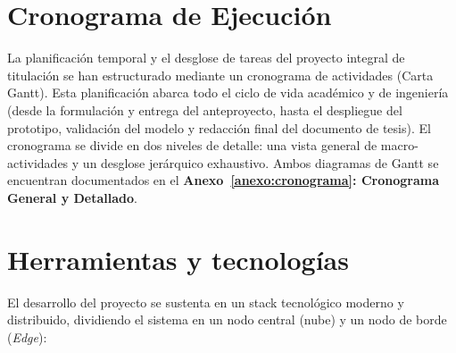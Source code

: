 \section{Cronograma de Ejecución}
La planificación temporal y el desglose de tareas del proyecto integral de titulación se han estructurado mediante un cronograma de actividades (Carta Gantt). Esta planificación abarca todo el ciclo de vida académico y de ingeniería (desde la formulación y entrega del anteproyecto, hasta el despliegue del prototipo, validación del modelo y redacción final del documento de tesis). El cronograma se divide en dos niveles de detalle: una vista general de macro-actividades y un desglose jerárquico exhaustivo. Ambos diagramas de Gantt se encuentran documentados en el \textbf{Anexo~\ref{anexo:cronograma}: Cronograma General y Detallado}.

\section{Herramientas y tecnologías}

El desarrollo del proyecto se sustenta en un stack tecnológico moderno y distribuido, dividiendo el sistema en un nodo central (nube) y un nodo de borde (\textit{Edge}):

